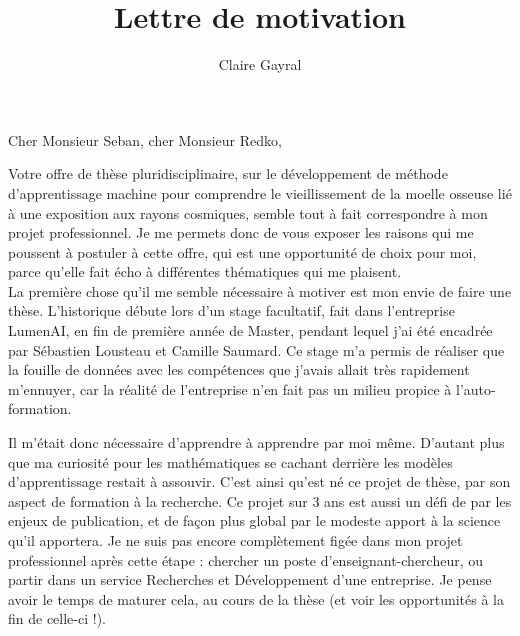 \documentclass[a4paper,12pt]{article}
\title{Lettre de motivation}
\author{Claire Gayral}
\date{}
\begin{document}
\maketitle

Cher Monsieur Seban, cher Monsieur Redko,

Votre offre de thèse pluridisciplinaire, sur le développement de méthode d'apprentissage machine pour comprendre le vieillissement de la moelle osseuse lié à une exposition aux rayons cosmiques, semble tout à fait correspondre à mon projet professionnel. Je me permets donc de vous exposer les raisons qui me poussent à postuler à cette offre, qui est une opportunité de choix pour moi, parce qu'elle fait écho à différentes thématiques qui me plaisent. \\


La première chose qu'il me semble nécessaire à motiver est mon envie de faire une thèse. L'historique débute lors d'un stage facultatif, fait dans l'entreprise LumenAI, en fin de première année de Master, pendant lequel j'ai été encadrée par Sébastien Lousteau et Camille Saumard. Ce stage m'a permis de réaliser que la fouille de données avec les compétences que j'avais allait très rapidement m'ennuyer, car la réalité de l'entreprise n'en fait pas un milieu propice à l'auto-formation. 

Il m'était donc nécessaire d'apprendre à apprendre par moi même. D'autant plus que ma curiosité pour les mathématiques se cachant derrière les modèles d'apprentissage restait à assouvir.
C'est ainsi qu'est né ce projet de thèse, par son aspect de formation à la recherche.  
Ce projet sur 3 ans est aussi un défi de par les enjeux de publication, et de façon plus global par le modeste apport à la science qu'il apportera. Je ne suis pas encore complètement figée dans mon projet professionnel après cette étape : chercher un poste d'enseignant-chercheur, ou partir dans un service Recherches et Développement d'une entreprise. Je pense avoir le temps de maturer cela, au cours de la thèse (et voir les opportunités à la fin de celle-ci !). 
\end{document}
